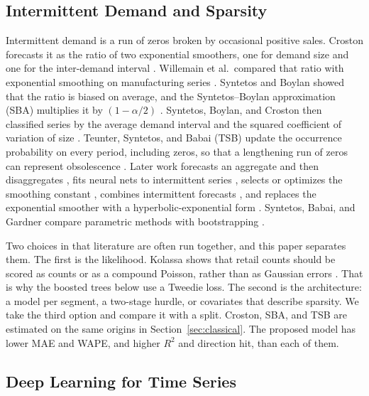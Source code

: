\documentclass[review,authoryear]{elsarticle}
\begin{document}
\subsection{Intermittent Demand and Sparsity}
\label{sec:intermittent}

Intermittent demand is a run of zeros broken by occasional positive sales. Croston forecasts it as the ratio of two exponential smoothers, one for demand size and one for the inter-demand interval \citep{croston1972forecasting}. Willemain et al.\ compared that ratio with exponential smoothing on manufacturing series \citep{willemain1994croston}. Syntetos and Boylan showed that the ratio is biased on average, and the Syntetos--Boylan approximation (SBA) multiplies it by $(1 - \alpha/2)$ \citep{syntetos2001bias,syntetos2005sba}. Syntetos, Boylan, and Croston then classified series by the average demand interval and the squared coefficient of variation of size \citep{syntetos2005categorization}. Teunter, Syntetos, and Babai (TSB) update the occurrence probability on every period, including zeros, so that a lengthening run of zeros can represent obsolescence \citep{teunter2011tsb}. Later work forecasts an aggregate and then disaggregates \citep{nikolopoulos2011adida}, fits neural nets to intermittent series \citep{kourentzes2013nn}, selects or optimizes the smoothing constant \citep{kourentzes2014select}, combines intermittent forecasts \citep{petropoulos2015comb}, and replaces the exponential smoother with a hyperbolic-exponential form \citep{prestwich2014hyperbolic}. Syntetos, Babai, and Gardner compare parametric methods with bootstrapping \citep{syntetos2015forecasting}.

Two choices in that literature are often run together, and this paper separates them. The first is the likelihood. Kolassa shows that retail counts should be scored as counts or as a compound Poisson, rather than as Gaussian errors \citep{kolassa2016count}. That is why the boosted trees below use a Tweedie loss. The second is the architecture: a model per segment, a two-stage hurdle, or covariates that describe sparsity. We take the third option and compare it with a split. Croston, SBA, and TSB are estimated on the same origins in Section~\ref{sec:classical}. The proposed model has lower MAE and WAPE, and higher $R^{2}$ and direction hit, than each of them.

\subsection{Deep Learning for Time Series}
\end{document}
